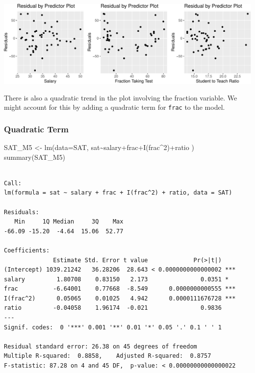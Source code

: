 \documentclass[
  letterpaper,
  DIV=11,
  numbers=noendperiod]{scrreprt}
\newenvironment{Shaded}{\begin{snugshade}}{\end{snugshade}}
\newcommand{\AttributeTok}[1]{\textcolor[rgb]{0.40,0.45,0.13}{#1}}
\newcommand{\DecValTok}[1]{\textcolor[rgb]{0.68,0.00,0.00}{#1}}
\newcommand{\FunctionTok}[1]{\textcolor[rgb]{0.28,0.35,0.67}{#1}}
\newcommand{\NormalTok}[1]{\textcolor[rgb]{0.00,0.23,0.31}{#1}}
\newcommand{\OtherTok}[1]{\textcolor[rgb]{0.00,0.23,0.31}{#1}}
\newcommand{\SpecialCharTok}[1]{\textcolor[rgb]{0.37,0.37,0.37}{#1}}
\begin{document}
\includegraphics{Ch5_files/figure-pdf/unnamed-chunk-44-1.pdf}

There is also a quadratic trend in the plot involving the fraction
variable. We might account for this by adding a quadratic term for
\texttt{frac} to the model.

\subsubsection{Quadratic Term}\label{quadratic-term}

\begin{Shaded}
\begin{Highlighting}[]
\NormalTok{SAT\_M5 }\OtherTok{\textless{}{-}} \FunctionTok{lm}\NormalTok{(}\AttributeTok{data=}\NormalTok{SAT, sat}\SpecialCharTok{\textasciitilde{}}\NormalTok{salary}\SpecialCharTok{+}\NormalTok{frac}\SpecialCharTok{+}\FunctionTok{I}\NormalTok{(frac}\SpecialCharTok{\^{}}\DecValTok{2}\NormalTok{)}\SpecialCharTok{+}\NormalTok{ratio )}
\FunctionTok{summary}\NormalTok{(SAT\_M5)}
\end{Highlighting}
\end{Shaded}

\begin{verbatim}

Call:
lm(formula = sat ~ salary + frac + I(frac^2) + ratio, data = SAT)

Residuals:
   Min     1Q Median     3Q    Max 
-66.09 -15.20  -4.64  15.06  52.77 

Coefficients:
              Estimate Std. Error t value             Pr(>|t|)    
(Intercept) 1039.21242   36.28206  28.643 < 0.0000000000000002 ***
salary         1.80708    0.83150   2.173               0.0351 *  
frac          -6.64001    0.77668  -8.549      0.0000000000555 ***
I(frac^2)      0.05065    0.01025   4.942      0.0000111676728 ***
ratio         -0.04058    1.96174  -0.021               0.9836    
---
Signif. codes:  0 '***' 0.001 '**' 0.01 '*' 0.05 '.' 0.1 ' ' 1

Residual standard error: 26.38 on 45 degrees of freedom
Multiple R-squared:  0.8858,    Adjusted R-squared:  0.8757 
F-statistic: 87.28 on 4 and 45 DF,  p-value: < 0.00000000000000022
\end{verbatim}
\end{document}
